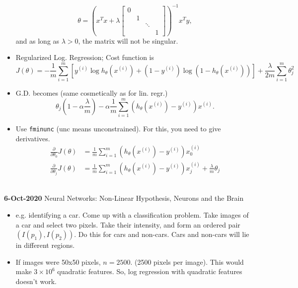 \documentclass[10pt]{article}
\begin{document}
\begin{itemize}
\begin{equation*}
      \theta = \left(x^Tx + \lambda \begin{bmatrix} 0 & & & \\ & 1 & & \\ & & \ddots & \\ & & & 1 \end{bmatrix}\right)^{-1}x^Ty,
    \end{equation*}
    and as long as $\lambda>0$, the matrix will not be singular.
  \item Regularized Log. Regression; Cost function is
    \begin{equation*}
      J(\theta) = - \frac{1}{m} \sum_{i=1}^m \left[y^{(i)} \log h_{\theta}(x^{(i)}) + (1 -y^{(i)})\log \left( 1 - h_{\theta}(x^{(i)}) \right)\right] + \frac{\lambda}{2m} \sum_{i=1}^m \theta_j^2
    \end{equation*}
  \item G.D. becomes (same cosmetically as for lin. regr.)
    \begin{equation*}
      \theta_j \left( 1 - \alpha \frac{\lambda}{m} \right) - \alpha \frac{1}{m} \sum_{i=1}^m \left( h_{\theta}(x^{(i)}) - y^{(i)} \right)x^{(i)}.
    \end{equation*}
  \item Use \texttt{fminunc} (unc means unconstrained). For this, you need to give derivatives.
    \begin{align*}
      \frac{ \partial }{\partial \theta_0} J(\theta) &= \frac{1}{m} \sum_{i=1}^m \left( h_{\theta}(x^{(i)}) - y^{(i)} \right)x_0^{(i)} \\
      \frac{ \partial }{\partial \theta_j} J(\theta) &= \frac{1}{m} \sum_{i=1}^m \left( h_{\theta}(x^{(i)}) - y^{(i)} \right)x_j^{(i)} + \frac{\lambda}{m} \theta_j
    \end{align*}
\end{itemize}
\hfill \\
{\large \textbf{6-Oct-2020} Neural Networks: Non-Linear Hypothesis, Neurons and the Brain}
\begin{itemize}
  \item e.g. identifying a car. Come up with a classification problem. Take images of a car and select two pixels. Take their intensity, and form an ordered pair $(I(p_1),I(p_2))$. Do this for cars and non-cars. Cars and non-cars will lie in different regions.
  \item If images were 50x50 pixels, $n=2500$. (2500 pixels per image). This would make $3\times10^6$ quadratic features. So, log regression with quadratic features doesn't work.
\end{itemize}
\end{document}
